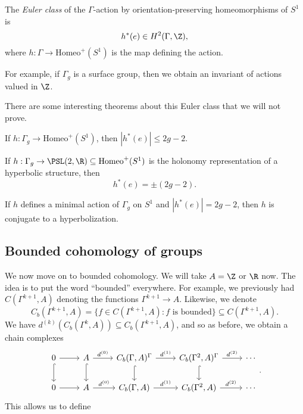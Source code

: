 \documentclass[a4paper]{article}
\newcommand\Homeo{\mathrm{Homeo}}
\begin{document}
\begin{defi}
  The \emph{Euler class} of the $\Gamma$-action by orientation-preserving homeomorphisms of $S^1$ is
  \[
    h^*(e) \in H^2(\Gamma, \Z),
  \]
  where $h: \Gamma \to \Homeo^+(S^1)$ is the map defining the action.
\end{defi}

For example, if $\Gamma_g$ is a surface group, then we obtain an invariant of actions valued in $\Z$.

There are some interesting theorems about this Euler class that we will not prove.
\begin{thm}
  If $h: \Gamma_g \to \Homeo^+(S^1)$, then $|h^*(e)| \leq 2g - 2$.
\end{thm}

\begin{thm}
  If $h: \Gamma_g \to \PSL(2, \R) \subseteq \Homeo^+(S^1)$ is the holonomy representation of a hyperbolic structure, then
  \[
    h^*(e) = \pm (2g - 2).
  \]
\end{thm}

\begin{thm}[Matsumoko, 1986]
  If $h$ defines a minimal action of $\Gamma_g$ on $S^1$ and $|h^*(e)| = 2g - 2$, then $h$ is conjugate to a hyperbolization.
\end{thm}

\subsection{Bounded cohomology of groups}
We now move on to bounded cohomology. We will take $A = \Z$ or $\R$ now. The idea is to put the word ``bounded'' everywhere. For example, we previously had $C(\Gamma^{k + 1}, A)$ denoting the functions $\Gamma^{k + 1} \to A$. Likewise, we denote
\[
  C_b(\Gamma^{k + 1}, A) = \{f \in C(\Gamma^{k + 1}, A) : f\text{ is bounded}\} \subseteq C(\Gamma^{k + 1}, A).
\]
We have $d^{(k)}(C_b(\Gamma^k, A)) \subseteq C_b(\Gamma^{k + 1}, A)$, and so as before, we obtain a chain complexes
\[
  \begin{tikzcd}
    0 \ar[r] \ar[d, hook] & A \ar[r, "d^{(0)}"] \ar[d, hook] & C_b(\Gamma, A)^\Gamma \ar[r, "d^{(1)}"] \ar[d, hook] & C_b(\Gamma^2, A)^\Gamma \ar[r, "d^{(2)}"]\ar[d, hook] & \cdots\\
    0 \ar[r] & A \ar[r, "d^{(0)}"] & C_b(\Gamma, A) \ar[r, "d^{(1)}"] & C_b(\Gamma^2, A) \ar[r, "d^{(2)}"] & \cdots
  \end{tikzcd}.
\]
This allows us to define
\end{document}
